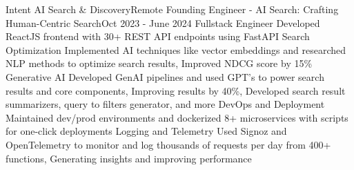 \resumeSubHeadingListEnd
\resumeSubheading
{Intent AI Search \& Discovery}{Remote}
{Founding Engineer - AI Search: Crafting Human-Centric Search}{Oct 2023 - June 2024}
\resumeItemListStart
\resumeItem
{Fullstack Engineer}
{Developed ReactJS frontend with 30+ REST API endpoints using FastAPI}
\resumeItem
{Search Optimization}
{Implemented AI techniques like vector embeddings and researched NLP methods to optimize search results, Improved NDCG score by 15\%}
\resumeItem
{Generative AI}
{Developed GenAI pipelines and used GPT's to power search results and core components, Improving results by 40\%, Developed search result summarizers, query to filters generator, and more}
\resumeItem
{DevOps and Deployment}
{Maintained dev/prod environments and dockerized 8+ microservices with scripts for one-click deployments}
\resumeItem
{Logging and Telemetry}
{Used Signoz and OpenTelemetry to monitor and log thousands of requests per day from 400+ functions, Generating insights and improving performance}
\resumeItemListEnd

\resumeSubHeadingListEnd

